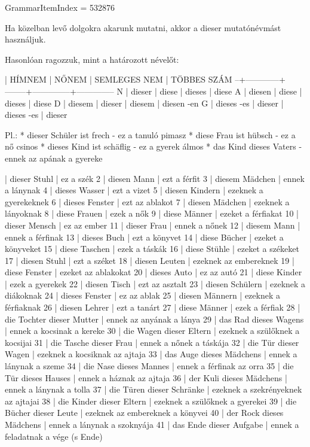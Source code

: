 \documentclass{article}
\newenvironment{desc}{\verbatim}{\endverbatim}
\newenvironment{exmp}{\verbatim}{\endverbatim}
\begin{document}
GrammarItemIndex = 532876

\begin{desc}
Ha közelban levő dolgokra akarunk mutatni, akkor a dieser mutatónévmást használjuk.

Hasonlóan ragozzuk, mint a határozott névelőt:

  | HÍMNEM     | NŐNEM  | SEMLEGES NEM | TÖBBES SZÁM
--+------------+--------+--------------+--------------
N | dieser     | diese  | dieses       | diese
A | diesen     | diese  | dieses       | diese
D | diesem     | dieser | diesem       | diesen -en
G | dieses -es | dieser | dieses -es   | dieser

Pl.: * dieser Schüler ist frech - ez a tanuló pimasz
* diese Frau ist hübsch - ez a nő csinos
* dieses Kind ist schäflig - ez a gyerek álmos
* das Kind dieses Vaters - ennek az apának a gyereke
\end{desc}

\begin{exmp}
1 | dieser Stuhl | ez a szék
2 | diesen Mann | ezt a férfit
3 | diesem Mädchen | ennek a lánynak
4 | dieses Wasser | ezt a vizet
5 | diesen Kindern | ezeknek a gyerekeknek
6 | dieses Fenster | ezt az ablakot
7 | diesen Mädchen | ezeknek a lányoknak
8 | diese Frauen | ezek a nők
9 | diese Männer | ezeket a férfiakat
10 | dieser Mensch | ez az ember
11 | dieser Frau | ennek a nőnek
12 | diesem Mann | ennek a férfinak
13 | dieses Buch | ezt a könyvet
14 | diese Bücher | ezeket a könyveket
15 | diese Taschen | ezek a táskák
16 | diese Stühle | ezeket a székeket
17 | diesen Stuhl | ezt a széket
18 | diesen Leuten | ezeknek az embereknek
19 | diese Fenster | ezeket az ablakokat
20 | dieses Auto | ez az autó
21 | diese Kinder | ezek a gyerekek
22 | diesen Tisch | ezt az asztalt
23 | diesen Schülern | ezeknek a diákoknak
24 | dieses Fenster | ez az ablak
25 | diesen Männern | ezeknek a férfiaknak
26 | diesen Lehrer | ezt a tanárt
27 | diese Männer | ezek a férfiak
28 | die Tochter dieser Mutter | ennek az anyának a lánya
29 | das Rad dieses Wagens | ennek a kocsinak a kereke
30 | die Wagen dieser Eltern | ezeknek a szülőknek a kocsijai
31 | die Tasche dieser Frau | ennek a nőnek a táskája
32 | die Tür dieser Wagen | ezeknek a kocsiknak az ajtaja
33 | das Auge dieses Mädchens | ennek a lánynak a szeme
34 | die Nase dieses Mannes | ennek a férfinak az orra
35 | die Tür dieses Hauses | ennek a háznak az ajtaja
36 | der Kuli dieses Mädchens | ennek a lánynak a tolla
37 | die Türen dieser Schränke | ezeknek a szekrényeknek az ajtajai
38 | die Kinder dieser Eltern | ezeknek a szülőknek a gyerekei
39 | die Bücher dieser Leute | ezeknek az embereknek a könyvei
40 | der Rock dieses Mädchens | ennek a lánynak a szoknyája
41 | das Ende dieser Aufgabe | ennek a feladatnak a vége (s Ende)
\end{exmp}
\end{document}
